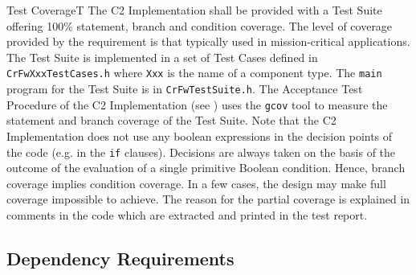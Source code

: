 \documentclass{pnp_article}
\begin{document}
\begin{fwReq}{Test Coverage}{T}
{The C2 Implementation shall be provided with a Test Suite offering 100\% statement, branch and condition coverage.}
{The level of coverage provided by the requirement is that typically used in mission-critical applications.}
{The Test Suite is implemented in a set of Test Cases defined in \texttt{CrFwXxxTestCases.h} where \texttt{Xxx} is the name of a component type. The \texttt{main} program for the Test Suite is in \texttt{CrFwTestSuite.h}.} 
{The Acceptance Test Procedure of the C2 Implementation (see \cite{ref:C2Implementation}) uses the \texttt{gcov} tool to measure the statement and branch coverage of the Test Suite. Note that the C2 Implementation does not use any boolean expressions in the decision 
points of the code (e.g. in the \texttt{if} clauses). Decisions are always taken on the basis of the outcome of the evaluation of a single primitive Boolean condition. Hence, branch coverage implies condition coverage. In a few cases, the design may make full coverage impossible to achieve. The reason for the partial coverage is explained in comments in the code which are extracted and printed in the test report.}
\end{fwReq}





\subsection{Dependency Requirements}\label{req:dependencyReqs}
\end{document}
